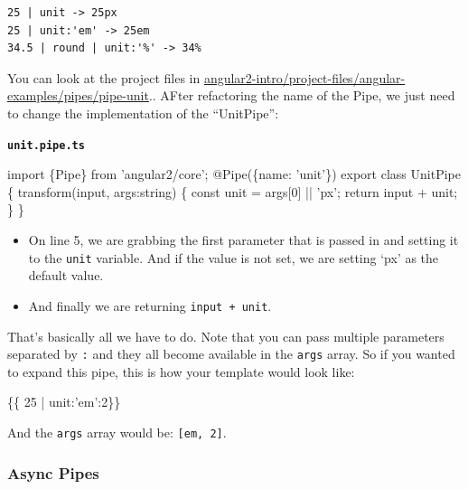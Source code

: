 \documentclass[12pt,]{article}
\newenvironment{Shaded}{}{}
\newcommand{\KeywordTok}[1]{\textcolor[rgb]{0.00,0.00,1.00}{{#1}}}
\newcommand{\DataTypeTok}[1]{{#1}}
\newcommand{\DecValTok}[1]{{#1}}
\newcommand{\FunctionTok}[1]{{#1}}
\newcommand{\NormalTok}[1]{{#1}}
\providecommand{\tightlist}{%
  \setlength{\itemsep}{0pt}\setlength{\parskip}{0pt}}
\begin{document}
\begin{verbatim}
25 | unit -> 25px
25 | unit:'em' -> 25em
34.5 | round | unit:'%' -> 34%
\end{verbatim}

You can look at the project files in
\href{https://github.com/aminmeyghani/angular2-intro/tree/master/project-files/angular-examples/pipes/pipe-unit}{angular2-intro/project-files/angular-examples/pipes/pipe-unit}..
AFter refactoring the name of the Pipe, we just need to change the
implementation of the ``UnitPipe'':

\textbf{\texttt{unit.pipe.ts}}

\begin{Shaded}
\begin{Highlighting}[numbers=left,,]
\KeywordTok{import \{Pipe\} from 'angular2/core';}
\FunctionTok{@Pipe}\NormalTok{(\{name: 'unit'\})}
\NormalTok{export }\KeywordTok{class} \NormalTok{UnitPipe \{}
  \FunctionTok{transform}\NormalTok{(input, args:string) \{}
    \DataTypeTok{const} \NormalTok{unit = args[}\DecValTok{0}\NormalTok{] || 'px';}
    \KeywordTok{return} \NormalTok{input + unit;}
  \NormalTok{\}}
\NormalTok{\}}
\end{Highlighting}
\end{Shaded}

\begin{itemize}
\tightlist
\item
  On line 5, we are grabbing the first parameter that is passed in and
  setting it to the \texttt{unit} variable. And if the value is not set,
  we are setting `px' as the default value.
\item
  And finally we are returning \texttt{input\ +\ unit}.
\end{itemize}

That's basically all we have to do. Note that you can pass multiple
parameters separated by \texttt{:} and they all become available in the
\texttt{args} array. So if you wanted to expand this pipe, this is how
your template would look like:

\begin{Shaded}
\begin{Highlighting}[numbers=left,,]
\NormalTok{\{\{ 25 | unit:'em':2\}\}}
\end{Highlighting}
\end{Shaded}

And the \texttt{args} array would be:
\texttt{{[}\textquotesingle{}em\textquotesingle{},\ 2{]}}.

\subsubsection{Async Pipes}\label{async-pipes}
\end{document}
